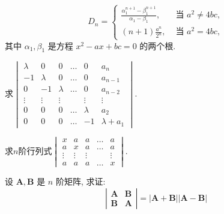 \begin{solution}
    \[
D_n= \begin{cases}\displaystyle \frac{\alpha_1^{n+1}-\beta_1^{n+1}}{\alpha_1-\beta_1}, & \text { 当 } a^2 \neq 4 b c, \\ \displaystyle (n+1) \frac{a^n}{2^n}, & \text { 当 } a^2=4 b c,\end{cases}
\]
其中 $\alpha_1, \beta_1$ 是方程 $x^2-a x+b c=0$ 的两个根.
\end{solution}

\begin{problem}
    求$\begin{vmatrix}
        \lambda &0 &0 &\dots &0 &a_n\\
        -1 &\lambda &0 &\dots &0 &a_{n-1}\\
        0 &-1 &\lambda &\dots &0 &a_{n-2}\\
        \vdots &\vdots &\vdots & &\vdots &\vdots\\
        0 &0 &0 &\dots &\lambda &a_2\\
        0 &0 &0 &\dots &-1 &\lambda +a_1
    \end{vmatrix}.$
\end{problem}

\begin{solution}
    
\end{solution}

\begin{problem}
    求$n$阶行列式$\begin{vmatrix}
        x &a &a &\dots &a\\
        a &x &a &\dots &a\\
        \vdots &\vdots &\vdots &  &\vdots\\
        a &a &a &\dots &x
    \end{vmatrix}.$
\end{problem}

\begin{solution}
    
\end{solution}

\begin{problem}
    设 $\boldsymbol{A}, \boldsymbol{B}$ 是 $n$ 阶矩阵, 求证:
$$
\left|\begin{array}{ll}
\boldsymbol{A} & \boldsymbol{B} \\
\boldsymbol{B} & \boldsymbol{A}
\end{array}\right|=|\boldsymbol{A}+\boldsymbol{B}||\boldsymbol{A}-\boldsymbol{B}|
$$
\end{problem}


